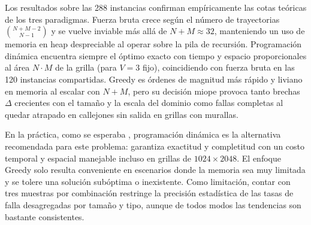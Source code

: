 Los resultados sobre las 288 instancias confirman empíricamente las cotas teóricas de los tres paradigmas. Fuerza bruta crece según el número de trayectorias $\binom{N+M-2}{N-1}$ y se vuelve inviable más allá de $N+M \approx 32$, manteniendo un uso de memoria en heap despreciable al operar sobre la pila de recursión. Programación dinámica encuentra siempre el óptimo exacto con tiempo y espacio proporcionales al área $N\cdot M$ de la grilla (para $V=3$ fijo), coincidiendo con fuerza bruta en las 120 instancias compartidas. Greedy es órdenes de magnitud más rápido y liviano en memoria al escalar con $N+M$, pero su decisión miope provoca tanto brechas $\Delta$ crecientes con el tamaño y la escala del dominio como fallas completas al quedar atrapado en callejones sin salida en grillas con murallas.

En la práctica, como se esperaba , programación dinámica es la alternativa recomendada para este problema: garantiza exactitud y completitud con un costo temporal y espacial manejable incluso en grillas de $1024\times 2048$. El enfoque Greedy solo resulta conveniente en escenarios donde la memoria sea muy limitada y se tolere una solución subóptima o inexistente. Como limitación, contar con tres muestras por combinación restringe la precisión estadística de las tasas de falla desagregadas por tamaño y tipo, aunque de todos modos las tendencias son bastante consistentes.
